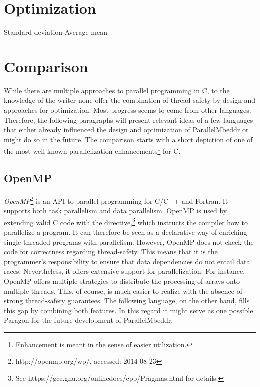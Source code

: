\section{Optimization}
Standard deviation
Average mean

\section{Comparison}
While there are multiple approaches to parallel programming in C, to the knowledge of the writer none offer the combination of thread-safety by design and approaches for optimization. Most progress seems to come from other languages. Therefore, the following paragraphs will present relevant ideas of a few languages that either already influenced the design and optimization of ParallelMbeddr or might do so in the future. The comparison starts with a short depiction of one of the most well-known parallelization enhancements\footnote{Enhancement is meant in the sense of easier utilization.} for C.

\subsection{OpenMP}
\textit{OpenMP}\footnote{http://openmp.org/wp/, accessed: 2014-08-23} is an API to parallel programming for C/C++ and Fortran\cite[p.~1]{OpenMP}. It supports both task parallelism and data parallelism. OpenMP is used by extending valid C code with the  directive,\footnote{See https://gcc.gnu.org/onlinedocs/cpp/Pragmas.html for details.} which instructs the compiler how to parallelize a program. It can therefore be seen as a declarative way of enriching single-threaded programs with parallelism. However, OpenMP does not check the code for correctness regarding thread-safety. This means that it is the programmer's responsibility to ensure that data dependencies do not entail data races. Nevertheless, it offers extensive support for parallelization. For instance, OpenMP offers multiple strategies to distribute the processing of arrays onto multiple threads. This, of course, is much easier to realize with the absence of strong thread-safety guarantees. The following language, on the other hand, fills this gap by combining both features. In this regard it might serve as one possible Paragon for the future development of ParallelMbeddr.


